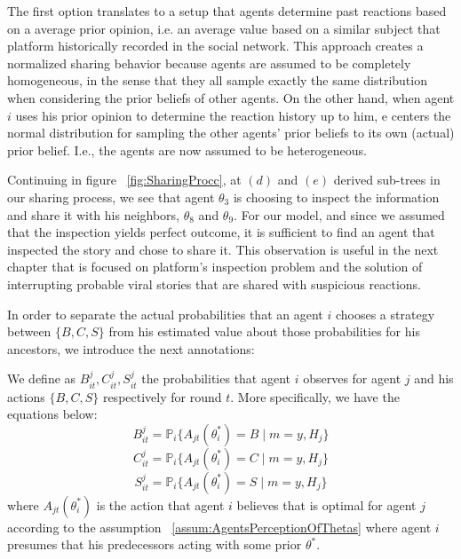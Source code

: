 The first option translates to a setup that agents determine past reactions based on a average prior opinion, i.e. an average value based on a similar subject that platform historically recorded in the social network. This approach creates a normalized sharing behavior because agents are assumed to be completely homogeneous, in the sense that they all sample exactly the same distribution when considering the prior beliefs of other agents. On the other hand, when agent $i$ uses his prior opinion to determine the reaction history up to him, e centers the normal distribution for sampling the other agents' prior beliefs to its own (actual) prior belief. I.e., the agents are now assumed to be heterogeneous.

Continuing in figure ~\ref{fig:SharingProcc}, at $(d)$ and $(e)$ derived sub-trees in our sharing process, we see that agent $\theta_3$ is choosing to inspect the information and share it with his neighbors, $\theta_8$ and $\theta_9$. For our model, and since we assumed that the inspection yields perfect outcome, it is sufficient to find an agent that inspected the story and chose to share it. This observation is useful in the next chapter that is focused on platform's inspection problem and the solution of interrupting probable viral stories that are shared with suspicious reactions.

In order to separate the actual probabilities that an agent $i$ chooses a strategy between $\{B,C,S\}$ from his estimated value about those probabilities for his ancestors, we introduce the next annotations:

\begin{definition}
	We define as $B_{it}^j,C_{it}^j,S_{it}^j$ the probabilities that agent $i$ observes for agent $j$ and his actions $\{B,C,S\}$ respectively for round $t$. More specifically, we have the equations below:
		$$B_{it}^j=\mathbb{P}_{i} \{A_{jt}(\theta_i^*) = B \mid m=y , H_j\}$$
		$$C_{it}^j=\mathbb{P}_{i} \{A_{jt}(\theta_i^*) = C \mid m=y , H_j\}$$
		$$S_{it}^j=\mathbb{P}_{i} \{A_{jt}(\theta_i^*) = S \mid m=y , H_j\}$$
where $A_{jt}(\theta_i^*)$ is the action that agent $i$ believes that is optimal for agent $j$ according to the assumption ~\ref{assum:AgentsPerceptionOfThetas} where agent $i$ presumes that his predecessors acting with some prior $\theta^*$.
\label{def:PresumedActionProbs}
\end{definition}

